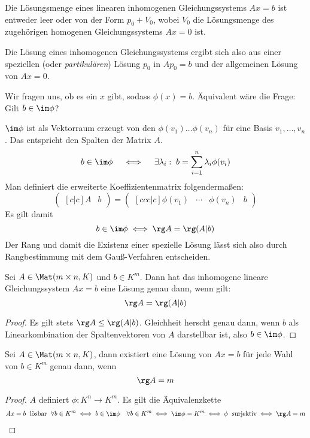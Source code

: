\documentclass{mycourse}
\begin{document}
Die Lösungsmenge eines linearen inhomogenen Gleichungssystems $Ax=b$ ist entweder leer oder von der Form $p_0+V_0$, wobei $V_0$ die Lösungsmenge des zugehörigen homogenen Gleichungssystems $Ax=0$ ist.

Die Lösung eines inhomogenen Gleichungssystems ergibt sich also aus einer speziellen (oder \emph{partikulären}) Lösung $p_0$ in $Ap_0 = b$ und der allgemeinen Lösung von $Ax=0$.

\begin{seg}[Existenz einer speziellen Lösung von $Ax=b$]
	Wir fragen uns, ob es ein $x$ gibt, sodass $\phi(x) = b$.
	Äquivalent wäre die Frage: Gilt $b\in\im\phi$?

	$\im\phi$ ist als Vektorraum erzeugt von den $\phi(v_1)\dotsc\phi(v_n)$ für eine Basis $v_1,\dotsc,v_n$.
	Das entspricht den Spalten der Matrix $A$.
\[
b\in\im\phi \quad \iff\quad \exists \lambda_i:\;b=\sum_{i=1}^n\lambda_i\phi(v_i)
\]
Man definiert die erweiterte Koeffizientenmatrix folgendermaßen:
\[
	\begin{pmatrix}[c|c] A&b\end{pmatrix}=\begin{pmatrix}[ccc|c]\phi(v_1)&\cdots&\phi(v_n)&b\end{pmatrix}
\]
Es gilt damit
\[
b\in\im\phi \iff \rg A = \rg(A|b)
\]
Der Rang und damit die Existenz einer spezielle Lösung lässt sich also durch Rangbestimmung mit dem Gauß-Verfahren entscheiden.
\end{seg}
\begin{thm} \label{thm:8.13}
Sei $A \in \Mat(m\times n,K)$ und $b\in K^m$. Dann hat das inhomogene lineare Gleichungssystem $Ax=b$ eine Lösung genau dann, wenn gilt:
\[
\rg A=\rg(A|b)
\]
\begin{proof}
	Es gilt stets $\rg A \le \rg(A|b)$.
	Gleichheit herscht genau dann, wenn $b$ als Linearkombination der Spaltenvektoren von $A$ darstellbar ist, also $b\in \im \phi$.
\end{proof}
\end{thm}

\begin{kor}
	\label{kor:8.14}
	Sei $A\in \Mat(m\times n, K)$, dann existiert eine Lösung von $Ax=b$ für jede Wahl von $b\in K^m$ genau dann, wenn
	\[
		\rg A = m
	\]
\begin{proof}
$A$ definiert $\phi:K^n\to K^m$.
Es gilt die Äquivalenzkette
\begin{align*}
Ax=b \; \text{ lösbar $\;\forall b\in K^m$} 
	\iff b\in\im\phi \quad \forall b\in K^m
	\iff \im \phi = K^m
	\iff \phi\; \text{ surjektiv} 
	\iff \rg A =m
\end{align*}
\end{proof}
\end{kor}
\end{document}
